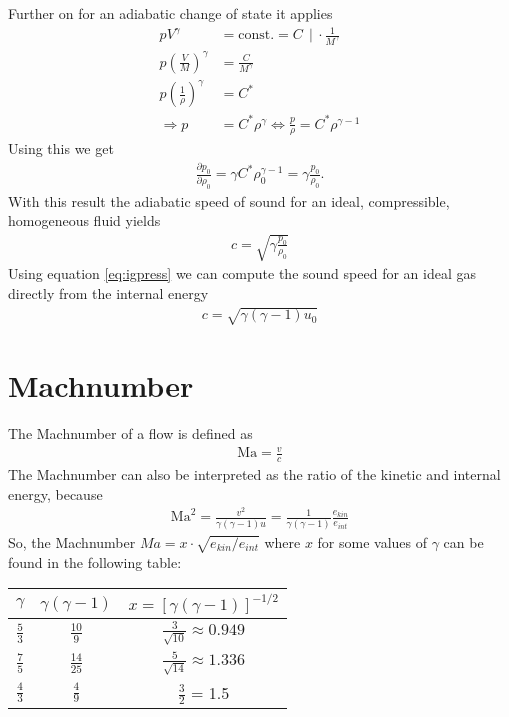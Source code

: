 \documentclass[a4paper,
					fontsize=12pt,
					twoside,
					pagesize,
					cleardoublepage=plain,
					headsepline,
					bibliography=totoc
					]{scrbook}
\newcommand{\lra}[1]{{ \left( #1 \right) }}
\newcommand{\lrb}[1]{{ \left[ #1 \right] }}
\begin{document}
Further on for an adiabatic change of state it applies
\begin{align}
p V^\gamma &= \text{const.} = C \ \ |\ \cdot\frac{1}{M^\gamma}\\
p \lra{\frac{V}{M}}^\gamma &= \frac{C}{M^\gamma}\\
p \lra{\frac{1}{\rho}}^\gamma &= C^*\\
\Longrightarrow 
p &= C^* \rho^\gamma \Longleftrightarrow \frac{p}{\rho} = C^* \rho^{\gamma-1}
\end{align}
Using this we get
\begin{align}
\frac{\partial p_0}{\partial \rho_0} = \gamma C^* \rho_0^{\gamma-1} 
= \gamma \frac{p_0}{\rho_0}.
\end{align}
With this result the adiabatic speed of sound for an ideal, compressible,
homogeneous fluid yields
\begin{align}
c=\sqrt{\gamma \frac{p_0}{\rho_0}}
\end{align}
Using equation \eqref{eq:igpress} we can compute the sound speed for an ideal gas 
directly from the internal energy
\begin{align}
c=\sqrt{\gamma (\gamma-1) u_0}
\end{align}
\section{Machnumber}
The Machnumber of a flow is defined as
\begin{align}
\text{Ma}=\frac{v}{c}
\end{align}
The Machnumber can also be interpreted as the ratio of the kinetic and internal 
energy, because
\begin{align}
\text{Ma}^2=\frac{v^2}{\gamma(\gamma-1) u}=\frac{1}{\gamma(\gamma-1)}\frac{e_{kin}}{e_{int}}
\end{align}
So, the Machnumber $Ma = x \cdot \sqrt{e_{kin}/e_{int}}$ where $x$ for some 
values of $\gamma$ can be found in the following table:  
\begin{center}
\begin{tabular}{ccc}
$\gamma$ & $\gamma(\gamma-1)$ & $x = \lrb{\gamma(\gamma-1)}^{-1/2}$ \\ 
\hline
\hline
$\frac{5}{3}$ & $\frac{10}{9}$ & $\frac{3}{\sqrt{10}}\approx 0.949$ \\  
$\frac{7}{5}$ & $\frac{14}{25}$ & $\frac{5}{\sqrt{14}}\approx 1.336$ \\  
$\frac{4}{3}$ & $\frac{4}{9}$ &  $\frac{3}{2}$ = 1.5\\ 
\hline 
\end{tabular}
\end{center} 
\end{document}
